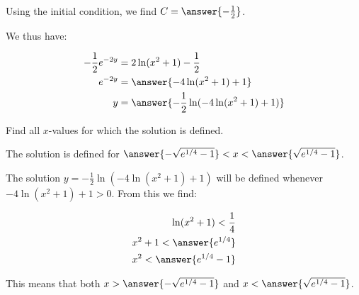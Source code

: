 \documentclass{ximera}
\begin{document}
\begin{exercise}
\begin{hint}
\begin{question}
Using the initial condition, we find $C=\answer{-\frac{1}{2}}$.

\begin{question}

We thus have:

\begin{align*}
-\frac{1}{2}e^{-2y} &= 2 \ln(x^2+1) -\frac{1}{2} \\
e^{-2y} &= \answer{-4 \ln(x^2+1)+1} \\
y&= \answer{-\frac{1}{2}\ln(-4 \ln(x^2+1)+1)}
\end{align*}

\end{question}
\end{question}
 \end{hint}
 
\begin{exercise}
Find all $x$-values for which the solution is defined.

The solution is defined for $\answer{-\sqrt{e^{1/4}-1}} < x <  \answer{\sqrt{e^{1/4}-1}}$.

\begin{hint}
The solution $y= -\frac{1}{2}\ln(-4 \ln(x^2+1)+1)$ will be defined whenever $-4 \ln(x^2+1)+1 >0$.  From this we find:

\begin{align*}
\ln(x^2+1) < \frac{1}{4} \\
x^2+1 < \answer{e^{1/4}} \\
x^2 < \answer{e^{1/4}-1} \\
\end{align*}

This means that both  $x>  \answer{-\sqrt{e^{1/4}-1}}$ and $x<  \answer{\sqrt{e^{1/4}-1}}$.
\end{hint}
\end{exercise}
 
\end{exercise}
\end{document}
